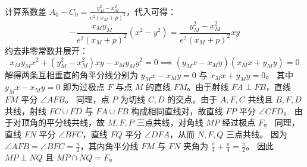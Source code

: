 \begin{solution}
计算系数差 $A_0 - C_0 = \frac{y_M^2 - x_M^2}{e^2(x_M+p)^2}$，代入可得：
$$ -\frac{x_M y_M}{e^2(x_M+p)^2} (x^2 - y^2) = \frac{y_M^2 - x_M^2}{e^2(x_M+p)^2} xy $$
约去非零常数并展开：
$$ x_M y_M x^2 + (y_M^2 - x_M^2)xy - x_M y_M y^2 = 0 \implies (y_M x - x_M y)(x_M x + y_M y) = 0 $$
解得两条互相垂直的角平分线分别为 $y_M x - x_M y = 0$ 与 $x_M x + y_M y = 0$。
其中 $y_M x - x_M y = 0$ 即为过极点 $F$ 与点 $M$ 的直线 $FM$。由于射线 $FA \perp FB$，直线 $FM$ 平分 $\angle AFB$。
同理，点 $P$ 为切线 $C, D$ 的交点。由于 $A, F, C$ 共线且 $B, F, D$ 共线，射线 $FC \cup FD$ 与 $FA \cup FB$ 构成相同直线对，故直线 $FP$ 平分 $\angle CFD$。
由于对顶角的平分线共线，故 $M, F, P$ 三点共线，对角线 $MP$ 经过极点 $F$。
同理，直线 $FN$ 平分 $\angle BFC$，直线 $FQ$ 平分 $\angle DFA$，从而 $N, F, Q$ 三点共线。
因为 $\angle AFB = \angle BFC = \frac{\pi}{2}$，其内角平分线 $FM$ 与 $FN$ 夹角为 $\frac{\pi}{4} + \frac{\pi}{4} = \frac{\pi}{2}$。
因此 $MP \perp NQ$ 且 $MP \cap NQ = F$。


\end{solution}
